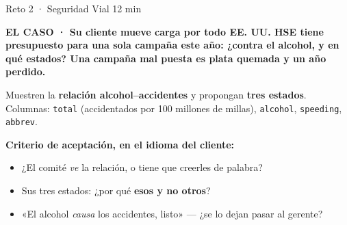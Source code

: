 \documentclass[aspectratio=169, 11pt]{beamer}
\begin{document}
\begin{frame}[shrink=8]{\faTools\hspace{4pt}Reto 2 · Seguridad Vial \hfill {\normalsize\color{arcaRed}\faClock\hspace{4pt}12 min}}
  \vspace{-4pt}
  \begin{tcolorbox}[colback=arcaGray, colframe=arcaRed, boxrule=0pt,
    leftrule=3pt, arc=3pt, left=7pt, right=7pt, top=2pt, bottom=2pt]
    {\scriptsize\color{arcaRed}\bfseries EL CASO ·
     \color{textMuted}\mdseries
     Su cliente mueve carga por todo EE. UU. HSE tiene presupuesto para
     \textbf{una sola campaña} este año: ¿contra el alcohol, y \textbf{en
     qué estados}? Una campaña mal puesta es plata quemada y un año perdido.}
  \end{tcolorbox}
  \vspace{2pt}
  \begin{encargo}
    {\scriptsize\color{textMuted}
     Muestren la \textbf{relación alcohol--accidentes} y propongan
     \textbf{tres estados}. Columnas: \texttt{total} (accidentados por 100
     millones de millas), \texttt{alcohol}, \texttt{speeding},
     \texttt{abbrev}.}
  \end{encargo}
  \vspace{2pt}
  {\scriptsize\color{textMuted}
   \textbf{Criterio de aceptación, en el idioma del cliente:}
  \begin{itemize}\setlength{\itemsep}{1pt}
    \item[{\color{arcaRed}\scriptsize\faQuestion}]
      ¿El comité \emph{ve} la relación, o tiene que creerles de palabra?
    \item[{\color{arcaRed}\scriptsize\faQuestion}]
      Sus tres estados: ¿por qué \textbf{esos y no otros}?
    \item[{\color{arcaRed}\scriptsize\faQuestion}]
      «El alcohol \emph{causa} los accidentes, listo» --- ¿se lo dejan
      pasar al gerente?
  \end{itemize}}
\end{frame}
\end{document}
